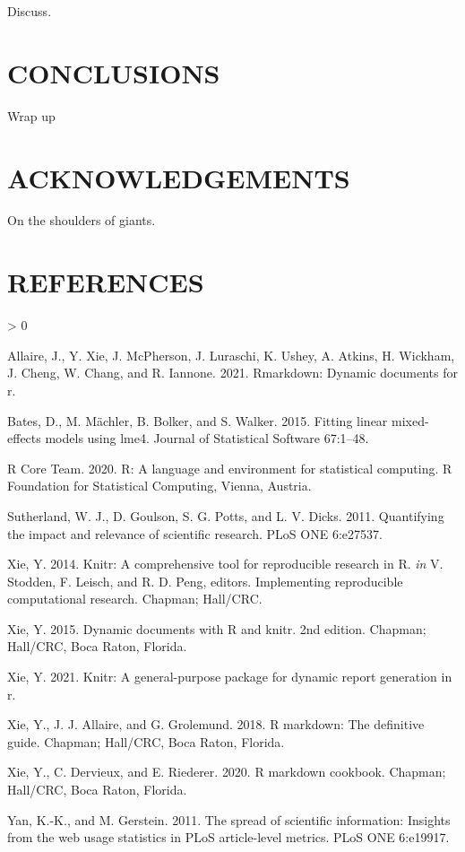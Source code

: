 \documentclass[
  11pt,
  a4paper,
]{article}
\newlength{\cslhangindent}
\newenvironment{CSLReferences}[2] %
 {%
  \setlength{\parindent}{0pt}
  \ifodd #1 \everypar{\setlength{\hangindent}{\cslhangindent}}\ignorespaces\fi
  \ifnum #2 > 0
  \setlength{\parskip}{#2\baselineskip}
  \fi
 }%
 {}
\begin{document}
Discuss.

\hypertarget{conclusions}{%
\section{CONCLUSIONS}\label{conclusions}}

Wrap up

\hypertarget{acknowledgements}{%
\section{ACKNOWLEDGEMENTS}\label{acknowledgements}}

On the shoulders of giants.

\hypertarget{references}{%
\section{REFERENCES}\label{references}}

\hypertarget{refs}{}
\begin{CSLReferences}{1}{0}
\leavevmode\hypertarget{ref-Allaire_2021}{}%
Allaire, J., Y. Xie, J. McPherson, J. Luraschi, K. Ushey, A. Atkins, H. Wickham, J. Cheng, W. Chang, and R. Iannone. 2021. Rmarkdown: Dynamic documents for r.

\leavevmode\hypertarget{ref-Bates_2015}{}%
Bates, D., M. Mächler, B. Bolker, and S. Walker. 2015. Fitting linear mixed-effects models using {lme4}. Journal of Statistical Software 67:1--48.

\leavevmode\hypertarget{ref-R_Core_Team_2020}{}%
R Core Team. 2020. R: A language and environment for statistical computing. R Foundation for Statistical Computing, Vienna, Austria.

\leavevmode\hypertarget{ref-Sutherland2011}{}%
Sutherland, W. J., D. Goulson, S. G. Potts, and L. V. Dicks. 2011. Quantifying the impact and relevance of scientific research. PLoS ONE 6:e27537.

\leavevmode\hypertarget{ref-Xie_2014}{}%
Xie, Y. 2014. Knitr: A comprehensive tool for reproducible research in {R}. \emph{in} V. Stodden, F. Leisch, and R. D. Peng, editors. Implementing reproducible computational research. Chapman; Hall/CRC.

\leavevmode\hypertarget{ref-Xie_2015}{}%
Xie, Y. 2015. Dynamic documents with {R} and knitr. 2nd edition. Chapman; Hall/CRC, Boca Raton, Florida.

\leavevmode\hypertarget{ref-Xie_2021}{}%
Xie, Y. 2021. Knitr: A general-purpose package for dynamic report generation in r.

\leavevmode\hypertarget{ref-Xie_2018}{}%
Xie, Y., J. J. Allaire, and G. Grolemund. 2018. R markdown: The definitive guide. Chapman; Hall/CRC, Boca Raton, Florida.

\leavevmode\hypertarget{ref-Xie_2020}{}%
Xie, Y., C. Dervieux, and E. Riederer. 2020. R markdown cookbook. Chapman; Hall/CRC, Boca Raton, Florida.

\leavevmode\hypertarget{ref-Yan2011}{}%
Yan, K.-K., and M. Gerstein. 2011. The spread of scientific information: Insights from the web usage statistics in PLoS article-level metrics. PLoS ONE 6:e19917.

\end{CSLReferences}
\end{document}

